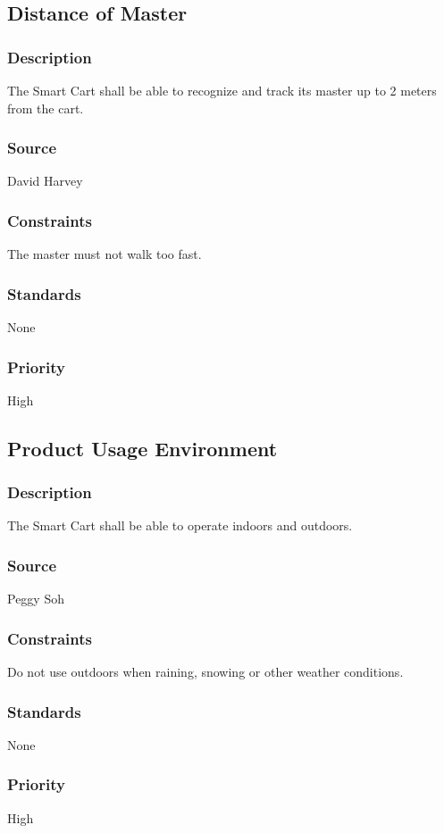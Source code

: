 \subsection{Distance of Master}
\subsubsection{Description}
The Smart Cart shall be able to recognize and track its master up to 2 meters from the cart. 
\subsubsection{Source}
David Harvey
\subsubsection{Constraints}
The master must not walk too fast.
\subsubsection{Standards}
None
\subsubsection{Priority}
High


\subsection{Product Usage Environment}
\subsubsection{Description}
The Smart Cart shall be able to operate indoors and outdoors. 
\subsubsection{Source}
Peggy Soh
\subsubsection{Constraints}
Do not use outdoors when raining, snowing or other weather conditions.
\subsubsection{Standards}
None
\subsubsection{Priority}
High
